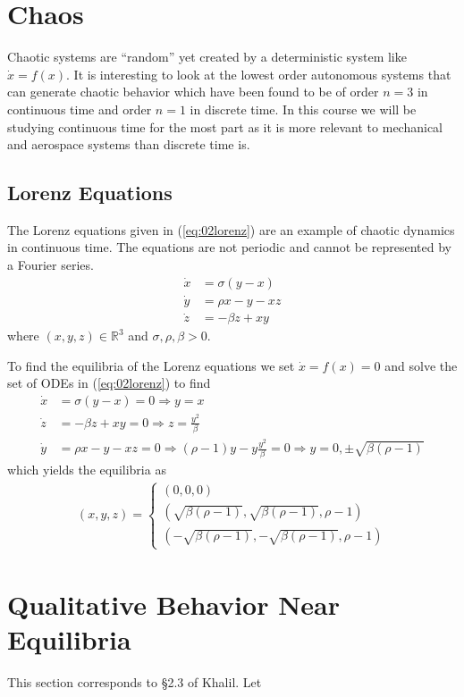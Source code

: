 \section{Chaos}
Chaotic systems are ``random'' yet created by a deterministic system like $\dot{x}=f(x)$.
It is interesting to look at the lowest order autonomous systems that can generate chaotic behavior which have been found to be of order $n=3$ in continuous time and order $n=1$ in discrete time.
In this course we will be studying continuous time for the most part as it is more relevant to mechanical and aerospace systems than discrete time is.

\subsection{Lorenz Equations}
The Lorenz equations given in (\ref{eq:02lorenz}) are an example of chaotic dynamics in continuous time.
The equations are not periodic and cannot be represented by a Fourier series.
\begin{align}
\label{eq:02lorenz}
\dot{x} &= \sigma(y - x) \nonumber \\
\dot{y} &= \rho x - y - xz \\
\dot{z} &= -\beta z + xy \nonumber
\end{align}
where $(x,y,z)\in\mathbb{R}^3$ and $\sigma, \rho, \beta > 0$.

To find the equilibria of the Lorenz equations we set $\dot{x}=f(x)=0$ and solve the set of ODEs in (\ref{eq:02lorenz}) to find
\begin{align*}
\dot{x} &= \sigma(y-x) = 0 \Rightarrow y = x \\
\dot{z} &= -\beta z + xy = 0 \Rightarrow z = \frac{y^2}{\beta} \\
\dot{y} &= \rho x-y-xz = 0 \Rightarrow (\rho-1)y - y\frac{y^2}{\beta} = 0 \Rightarrow y = 0, \pm\sqrt{\beta(\rho-1)}
\end{align*}
which yields the equilibria as
\begin{align*}
(x,y,z) = \begin{cases} (0,0,0) \\ (\sqrt{\beta(\rho-1)}, \sqrt{\beta(\rho-1)}, \rho-1) \\ (-\sqrt{\beta(\rho-1)}, -\sqrt{\beta(\rho-1)}, \rho-1) \end{cases}
\end{align*}

\section{Qualitative Behavior Near Equilibria}
This section corresponds to \S2.3 of Khalil.
Let

